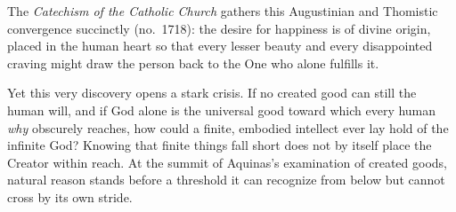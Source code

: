 The \emph{Catechism of the Catholic Church} gathers this Augustinian and Thomistic convergence succinctly (no.\ 1718): the desire for happiness is of divine origin, placed in the human heart so that every lesser beauty and every disappointed craving might draw the person back to the One who alone fulfills it.

Yet this very discovery opens a stark crisis. If no created good can still the human will, and if God alone is the universal good toward which every human \emph{why} obscurely reaches, how could a finite, embodied intellect ever lay hold of the infinite God? Knowing that finite things fall short does not by itself place the Creator within reach. At the summit of Aquinas's examination of created goods, natural reason stands before a threshold it can recognize from below but cannot cross by its own stride.
